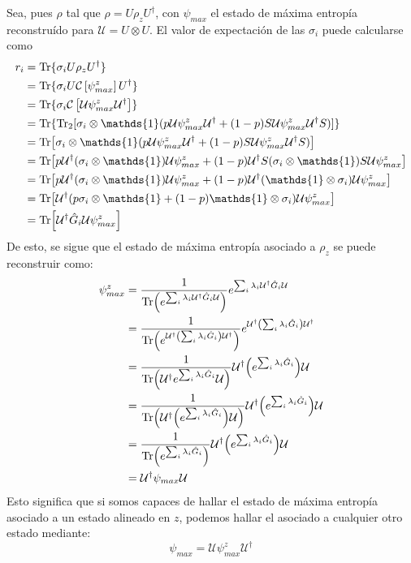\documentclass[onecolumn,11pt]{article}
\newcommand{\mcU}{\mathcal{U}}
\newcommand{\mcC}{\mathcal{C}}
\newcommand{\Id}{\mathds{1}}%
\newcommand{\CG}[1]{\mcC\left[#1\right]}
\begin{document}
Sea, pues $\rho$ tal que $\rho=U\rho_{z}U^{\dag}$, con $\psi_{max}$ el estado de máxima entropía reconstruído para  $\mcU=U\otimes U$. El valor de expectación de las $\sigma_{i}$ puede calcularse como
\begin{align*}
r_{i}&=\Tr\{\sigma_{i}U\rho_{z}U^{\dag}\}\\
&=\Tr\{\sigma_{i}U\CG{\psi_{max}^{z}}U^{\dag}\}\\
&=\Tr\{\sigma_{i}\CG{\mcU\psi_{max}^{z}\mcU^{\dag}}\}\\
&=\Tr\{\Tr_{2}[\sigma_{i}\otimes\Id(p\mcU\psi_{max}^{z}\mcU^{\dag}+(1-p)S\mcU\psi_{max}^{z}\mcU^{\dag}S)]\}\\
&=\Tr[\sigma_{i}\otimes\Id(p\mcU\psi_{max}^{z}\mcU^{\dag}+(1-p)S\mcU\psi_{max}^{z}\mcU^{\dag}S)]\\
&=\Tr[p\mcU^{\dag}(\sigma_{i}\otimes\Id)\mcU\psi_{max}^{z}+(1-p)\mcU^{\dag}S(\sigma_{i}\otimes\Id) S\mcU\psi_{max}^{z}]\\
&=\Tr[p\mcU^{\dag}(\sigma_{i}\otimes\Id)\mcU\psi_{max}^{z}+(1-p)\mcU^{\dag}(\Id\otimes\sigma_{i})\mcU\psi_{max}^{z}]\\
&=\Tr[\mcU^{\dag}(p\sigma_{i}\otimes\Id+(1-p)\Id\otimes\sigma_{i})\mcU\psi_{max}^{z}]\\
&=\Tr[\mcU^{\dag}\hat{G}_{i}\mcU\psi_{max}^{z}]\\
\end{align*}
De esto, se sigue que el estado de máxima entropía asociado a $\rho_{z}$ se puede reconstruir como:
\begin{align*}
\psi_{max}^{z}&=\frac{1}{\Tr(e^{\sum_{i}\lambda_{i}\mcU^{\dag}\hat{G}_{i}\mcU})}e^{\sum_{i}\lambda_{i}\mcU^{\dag}\hat{G}_{i}\mcU}\\
&=\frac{1}{\Tr(e^{\mcU^{\dag}\qty(\sum_{i}\lambda_{i}\hat{G}_{i})\mcU^{\dag}})}e^{\mcU^{\dag}\qty(\sum_{i}\lambda_{i}\hat{G}_{i})\mcU^{\dag}}\\
&=\frac{1}{\Tr(\mcU^{\dag}e^{\sum_{i}\lambda_{i}\hat{G}_{i}}\mcU)}\mcU^{\dag}\qty(e^{\sum_{i}\lambda_{i}\hat{G}_{i}})\mcU\\
&=\frac{1}{\Tr(\mcU^{\dag}\qty(e^{\sum_{i}\lambda_{i}\hat{G}_{i}})\mcU)}\mcU^{\dag}\qty(e^{\sum_{i}\lambda_{i}\hat{G}_{i}})\mcU\\
&=\frac{1}{\Tr(e^{\sum_{i}\lambda_{i}\hat{G}_{i}})}\mcU^{\dag}\qty(e^{\sum_{i}\lambda_{i}\hat{G}_{i}})\mcU\\
&=\mcU^{\dag}\psi_{max}\mcU
\end{align*}
Esto significa que si somos capaces de hallar el estado de máxima entropía asociado a un estado alineado en $z$, podemos hallar el asociado a cualquier otro estado mediante:
\begin{equation}
\psi_{max}=\mcU\psi_{max}^{z}\mcU^{\dag}
\end{equation}
\end{document}
